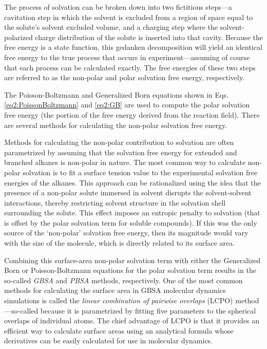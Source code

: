 The process of solvation can be broken down into two fictitious steps---a
cavitation step in which the solvent is excluded from a region of space equal to
the solute's solvent excluded volume, and a charging step where the
solvent-polarized charge distribution of the solute is inserted into that
cavity. Because the free energy is a state function, this gedanken decomposition
will yield an identical free energy to the true process that occurs in
experiment---assuming of course that each process can be calculated exactly.
The free energies of these two steps are referred to as the non-polar and polar
solvation free energy, respectively.

The Poisson-Boltzmann and Generalized Born equations shown in Eqs.
\ref{eq2:PoissonBoltzmann} and \ref{eq2:GB} are used to compute the polar
solvation free energy (\ie the portion of the free energy derived from the
reaction field). There are several methods for calculating the non-polar
solvation free energy.

Methods for calculating the non-polar contribution to solvation are often
parametrized by assuming that the solvation free energy for extended and
branched alkanes is non-polar in nature. The most common way to calculate
non-polar solvation is to fit a surface tension value to the experimental
solvation free energies of the alkanes.
\cite{Cramer_Book_EssentialsCompChem_2004} This approach can be rationalized
using the idea that the presence of a non-polar solute immersed in solvent
disrupts the solvent-solvent interactions, thereby restricting solvent structure
in the solvation shell surrounding the solute. This effect imposes an entropic
penalty to solvation (that is offset by the polar solvation term for soluble
compounds).  If this was the only source of the `non-polar' solvation free
energy, then its magnitude would vary with the size of the molecule, which is
directly related to its surface area.

Combining this surface-area non-polar solvation term with either the Generalized
Born or Poisson-Boltzmann equations for the polar solvation term results in the
so-called \emph{GBSA} and \emph{PBSA} methods, respectively. One of the most
common methods for calculating the surface area in GBSA molecular dynamics
simulations is called the \emph{linear combination of pairwise overlaps} (LCPO)
method---so-called because it is parametrized by fitting five parameters to the
spherical overlaps of individual atoms. \cite{Weiser_JComputChem_1999_v20_p217}
The chief advantage of LCPO is that it provides an efficient way to calculate
surface areas using an analytical formula whose derivatives can be easily
calculated for use in molecular dynamics.

